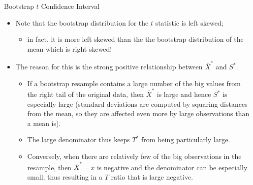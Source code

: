 \documentclass[
  ignorenonframetext,
]{beamer}
\providecommand{\tightlist}{%
  \setlength{\itemsep}{0pt}\setlength{\parskip}{0pt}}
\begin{document}
\begin{frame}{Bootstrap \(t\) Confidence Interval}
\label{bootstrap-t-confidence-interval-7}
\begin{itemize}
\item
  Note that the bootstrap distribution for the \(t\) statistic is left
  skewed;

  \begin{itemize}
  \tightlist
  \item
    in fact, it is more left skewed than the the bootstrap distribution
    of the mean which is right skewed!
  \end{itemize}
\item
  The reason for this is the strong positive relationship between
  \(\bar{X}^*\) and \(S^*\).

  \begin{itemize}
  \tightlist
  \item
    If a bootstrap resample contains a large number of the big values
    from the right tail of the original data, then \(\bar{X}^*\) is
    large and hence \(S^*\) is especially large (standard deviations are
    computed by squaring distances from the mean, so they are affected
    even more by large observations than a mean is).
  \item
    The large denominator thus keeps \(T^*\) from being particularly
    large.
  \item
    Conversely, when there are relatively few of the big observations in
    the resample, then \(\bar{X}^*-\bar{x}\) is negative and the
    denominator can be especially small, thus resulting in a \(T\) ratio
    that is large negative.
  \end{itemize}
\end{itemize}
\end{frame}
\end{document}
